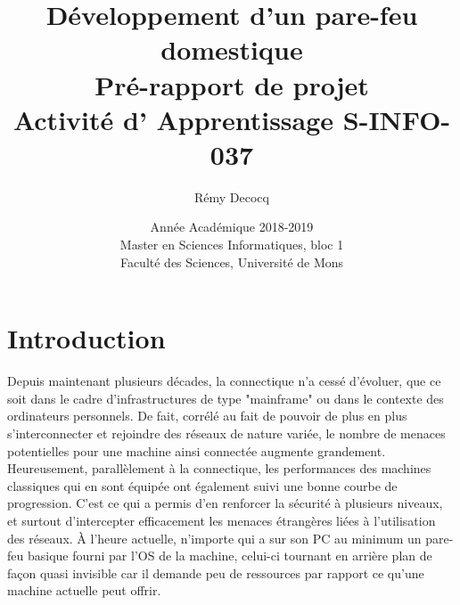 \documentclass[]{article}
\begin{document}
\title{
\vspace{1.6cm}
{\Huge Développement d'un pare-feu domestique}\\
\vspace{0.5cm}
{\Huge Pré-rapport de projet}\\
\vspace{0.2cm}
{\large Activité d' Apprentissage \textsf{S-INFO-037}}\\
}



\author{
\vspace{0.9cm}
\huge{Rémy Decocq}
}

\date{
\vspace{8.5cm}
Année Académique 2018-2019\\
Master en Sciences Informatiques, bloc 1\\
Faculté des Sciences, Université de Mons}

\maketitle          

\thispagestyle{empty}   

\newpage

\tableofcontents
\newpage

\section*{Introduction}

Depuis maintenant plusieurs décades, la connectique n'a cessé d'évoluer, que ce soit dans le cadre d'infrastructures de type "mainframe" ou dans le contexte des ordinateurs personnels. De fait, corrélé au fait de pouvoir de plus en plus s'interconnecter et rejoindre des réseaux de nature variée, le nombre de menaces potentielles pour une machine ainsi connectée augmente grandement. Heureusement, parallèlement à la connectique, les performances des machines classiques qui en sont équipée ont également suivi une bonne courbe de progression. C'est ce qui a permis d'en renforcer la sécurité à plusieurs niveaux, et surtout d'intercepter efficacement les menaces étrangères liées à l'utilisation des réseaux. À l'heure actuelle, n'importe qui a sur son PC au minimum un pare-feu basique fourni par l'OS de la machine, celui-ci tournant en arrière plan de façon quasi invisible car il demande peu de ressources par rapport ce qu'une machine actuelle peut offrir.\\
\end{document}
